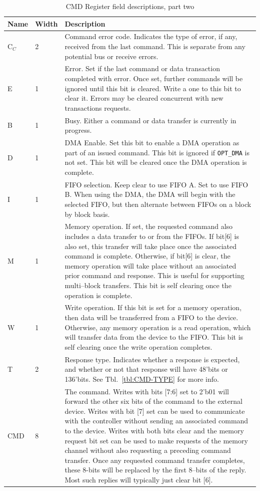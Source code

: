 \documentclass{gqtekspec}
\begin{document}
\begin{table}\begin{center}
\begin{tabular}{|p{1.2in}|p{0.5in}|p{3.5in}|}\hline
	\rowcolor[gray]{0.85} Name & Width & Description\\\hline\hline
C$_C$&2& Command error code.  Indicates the type of error, if any, received
	from the last command.  This is separate from any potential bus or
	receive errors. \\
E & 1 & Error.  Set if the last command or data transaction completed with
	error.  Once set, further commands will be ignored until this bit is
	cleared.  Write a one to this bit to clear it.  Errors may be cleared
	concurrent with new transactions requests. \\
B & 1 & Busy.  Either a command or data transfer is currently in
	progress.\\
D & 1 & DMA Enable.  Set this bit to enable a DMA operation as part of an
	issued command.  This bit is ignored if {\tt OPT\_DMA} is not set.
	This bit will be cleared once the DMA operation is complete.\\
I & 1 & FIFO selection.  Keep clear to use FIFO A.  Set to use FIFO B.
	When using the DMA, the DMA will begin with the selected FIFO, but then
	alternate between FIFOs on a block by block basis.  \\
M & 1 & Memory operation.  If set, the requested command also includes a data
	transfer to or from the FIFOs.  If bit[6] is also set, this transfer
	will take place once the associated command is complete.  Otherwise, if
	bit[6] is clear, the memory operation will take place without an
	associated prior command and response.  This is useful for supporting
	multi--block transfers.  This bit is self clearing once the operation
	is complete.\\
W & 1 & Write operation.  If this bit is set for a memory operation, then
	data will be transferred from a FIFO to the device.  Otherwise, any
	memory operation is a read operation, which will transfer data from
	the device to the FIFO.  This bit is self clearing once the write
	operation completes.\\
T & 2 & Response type.  Indicates whether a response is expected, and
	whether or not that response will have 48'bits or 136'bits.
	See Tbl.~\ref{tbl:CMD-TYPE} for more info.\\
CMD & 8 & The command.  Writes with bits [7:6] set to 2'b01 will forward
	the other six bits of the command to the external device.  Writes with
	bit [7] set can be used to communicate with the controller without
	sending an associated command to the device.  Writes with both bits
	clear and the memory request bit set can be used to make requests of
	the memory channel without also requesting a preceding command
	transfer.  Once any requested command transfer completes, these
	8-bits will be replaced by the first 8--bits of the reply.  Most
	such replies will typically just clear bit [6].
	\\\hline
\end{tabular}
\caption{CMD Register field descriptions, part two}\label{tbl:CMD2}
\end{center}\end{table}
\end{document}
